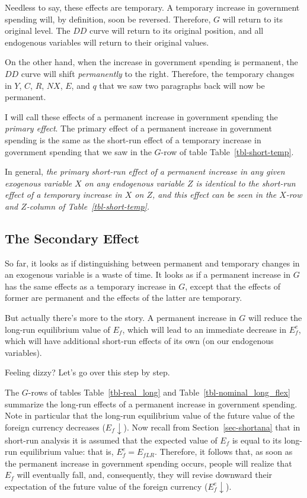 \documentclass[
  letterpaper,
]{book}
\theoremstyle{plain}
\theoremstyle{remark}
\begin{document}
Needless to say, these effects are temporary. A temporary increase in
government spending will, by definition, soon be reversed. Therefore,
\(G\) will return to its original level. The \(DD\) curve will return to
its original position, and all endogenous variables will return to their
original values.

On the other hand, when the increase in government spending is
permanent, the \(DD\) curve will shift \emph{permanently} to the right.
Therefore, the temporary changes in \(Y\), \(C\), \(R\), \(NX\), \(E\),
and \(q\) that we saw two paragraphs back will now be permanent.

I will call these effects of a permanent increase in government spending
the \emph{primary effect}. The primary effect of a permanent increase in
government spending is the same as the short-run effect of a temporary
increase in government spending that we saw in the \(G\)-row of table
Table~\ref{tbl-short-temp}.

In general, \emph{the primary short-run effect of a permanent increase
in any given exogenous variable \(X\) on any endogenous variable \(Z\)
is identical to the short-run effect of a temporary increase in \(X\) on
\(Z\), and this effect can be seen in the \(X\)-row and \(Z\)-column of
Table~\ref{tbl-short-temp}.}

\subsection{The Secondary Effect}\label{sec-fiscal-short-perm-scondary}

So far, it looks as if distinguishing between permanent and temporary
changes in an exogenous variable is a waste of time. It looks as if a
permanent increase in \(G\) has the same effects as a temporary increase
in \(G\), except that the effects of former are permanent and the
effects of the latter are temporary.

But actually there's more to the story. A permanent increase in \(G\)
will reduce the long-run equilibrium value of \(E_f\), which will lead
to an immediate decrease in \(E_f^e\), which will have additional
short-run effects of its own (on our endogenous variables).

Feeling dizzy? Let's go over this step by step.

The \(G\)-rows of tables Table~\ref{tbl-real_long} and
Table~\ref{tbl-nominal_long_flex} summarize the long-run effects of a
permanent increase in government spending. Note in particular that the
long-run equilibrium value of the future value of the foreign currency
decreases (\(E_f\downarrow\)). Now recall from
Section~\ref{sec-shortana} that in short-run analysis it is assumed that
the expected value of \(E_f\) is equal to its long-run equilibrium
value: that is, \(E_f^e=E_{fLR}\). Therefore, it follows that, as soon
as the permanent increase in government spending occurs, people will
realize that \(E_f\) will eventually fall, and, consequently, they will
revise downward their expectation of the future value of the foreign
currency (\(E_f^e\downarrow\)).
\end{document}
